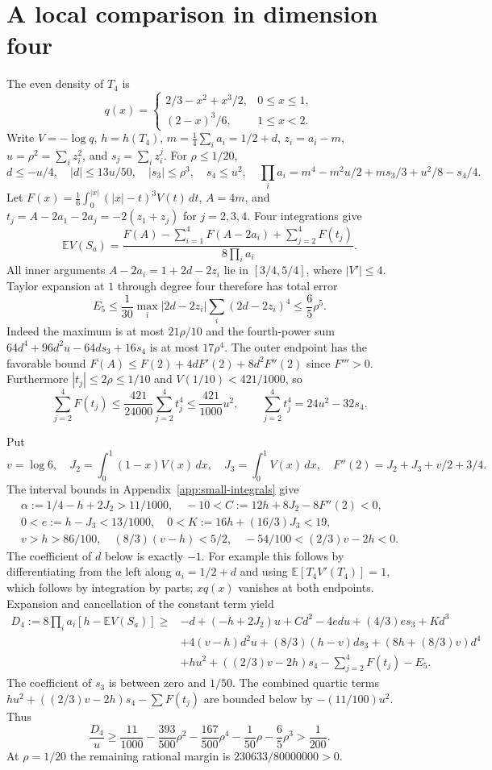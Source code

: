 \documentclass[11pt,a4paper]{article}
\theoremstyle{remark}\newtheorem{remark}[theorem]{Remark}
\newcommand{\E}{\mathbb E}
\begin{document}
\section{A local comparison in dimension four}\label{app:small-four}

The even density of $T_4$ is
\[
q(x)=\begin{cases}2/3-x^2+x^3/2,&0\le x\le1,\\
(2-x)^3/6,&1\le x<2.
\end{cases}
\]
Write $V=-\log q$, $h=h(T_4)$, $m=\frac14\sum_i a_i=1/2+d$,
$z_i=a_i-m$, $u=\rho^2=\sum_i z_i^2$, and $s_j=\sum_i z_i^j$.
For $\rho\le1/20$,
\[
d\le-u/4,\quad |d|\le13u/50,\quad |s_3|\le\rho^3,\quad s_4\le u^2,
\quad \prod_i a_i=m^4-m^2u/2+ms_3/3+u^2/8-s_4/4.
\]
Let $F(x)=\frac16\int_0^{|x|}(|x|-t)^3V(t)\,dt$, $A=4m$, and
$t_j=A-2a_1-2a_j=-2(z_1+z_j)$ for $j=2,3,4$.
Four integrations give
\[
\E V(S_a)=\frac{F(A)-\sum_{i=1}^4F(A-2a_i)+\sum_{j=2}^4F(t_j)}
                     {8\prod_i a_i}.
\]
All inner arguments $A-2a_i=1+2d-2z_i$ lie in $[3/4,5/4]$,
where $|V'|\le4$. Taylor expansion at $1$ through degree four therefore
has total error
\[
E_5\le\frac1{30}\max_i|2d-2z_i|\sum_i(2d-2z_i)^4
       \le\frac65\rho^5.
\]
Indeed the maximum is at most $21\rho/10$ and the fourth-power sum
$64d^4+96d^2u-64ds_3+16s_4$ is at most $17\rho^4$.
The outer endpoint has the favorable bound
$F(A)\le F(2)+4dF'(2)+8d^2F''(2)$ since $F'''>0$.
Furthermore $|t_j|\le2\rho\le1/10$ and $V(1/10)<421/1000$, so
\[
\sum_{j=2}^4F(t_j)\le\frac{421}{24000}\sum_{j=2}^4t_j^4
\le\frac{421}{1000}u^2,
\qquad \sum_{j=2}^4t_j^4=24u^2-32s_4.
\]

Put
\[
v=\log6,\quad J_2=\int_0^1(1-x)V(x)\,dx,\quad
J_3=\int_0^1V(x)\,dx,\quad F''(2)=J_2+J_3+v/2+3/4.
\]
The interval bounds in Appendix~\ref{app:small-integrals} give
\[
\begin{gathered}
\alpha:=1/4-h+2J_2>11/1000,\quad -10<C:=12h+8J_2-8F''(2)<0,\\
0<e:=h-J_3<13/1000,\quad0<K:=16h+(16/3)J_3<19,\\
v>h>86/100,\quad (8/3)(v-h)<5/2,\quad -54/100<(2/3)v-2h<0.
\end{gathered}
\]
The coefficient of $d$ below is exactly $-1$. For example this follows
by differentiating from the left along $a_i=1/2+d$ and using
$\E[T_4V'(T_4)]=1$, which follows by integration by parts;
$xq(x)$ vanishes at both endpoints.
Expansion and cancellation of the constant term yield
\begin{align*}
D_4:=8\prod_i a_i[h-\E V(S_a)]\ge{}&-d+(-h+2J_2)u+Cd^2-4edu
                        +(4/3)e s_3+Kd^3\\
&+4(v-h)d^2u+(8/3)(h-v)ds_3+(8h+(8/3)v)d^4\\
&+hu^2+((2/3)v-2h)s_4-\sum_{j=2}^4F(t_j)-E_5.
\end{align*}
The coefficient of $s_3$ is between zero and $1/50$. The combined
quartic terms $hu^2+((2/3)v-2h)s_4-\sum F(t_j)$ are bounded below
by $-(11/100)u^2$. Thus
\[
\frac{D_4}{u}\ge\frac{11}{1000}-\frac{393}{500}\rho^2
 -\frac{167}{500}\rho^4-\frac1{50}\rho-\frac65\rho^3>\frac1{200}.
\]
At $\rho=1/20$ the remaining rational margin is
$230633/80000000>0$.
\end{document}
